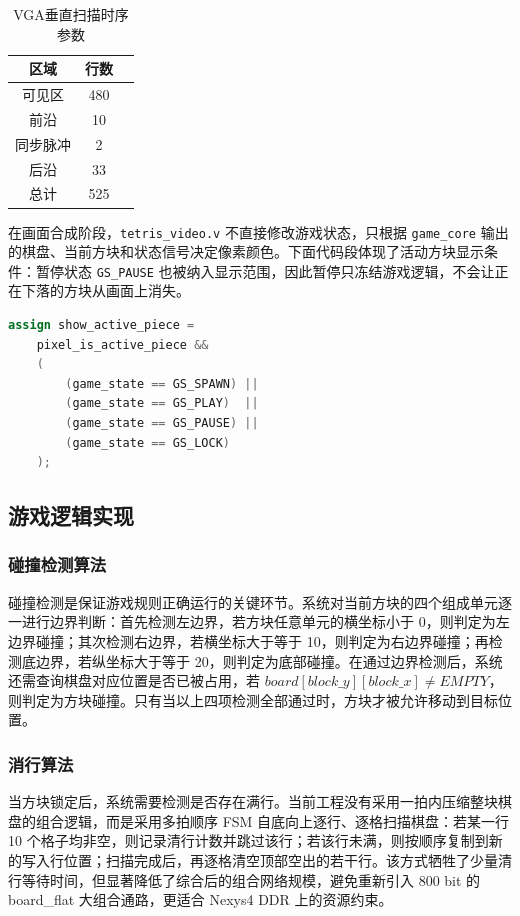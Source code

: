\documentclass[UTF8,zihao=-4]{ctexart}
\begin{document}
\begin{table}[H]
\centering
\caption{VGA垂直扫描时序参数}
\begin{tabular}{ccc}
\toprule
区域 & 行数 \\
\midrule
可见区 & 480 \\
前沿 & 10 \\
同步脉冲 & 2 \\
后沿 & 33 \\
总计 & 525 \\
\bottomrule
\end{tabular}
\end{table}

在画面合成阶段，\texttt{tetris\_video.v} 不直接修改游戏状态，只根据 \texttt{game\_core} 输出的棋盘、当前方块和状态信号决定像素颜色。下面代码段体现了活动方块显示条件：暂停状态 \texttt{GS\_PAUSE} 也被纳入显示范围，因此暂停只冻结游戏逻辑，不会让正在下落的方块从画面上消失。

\begin{lstlisting}[language=Verilog,caption={暂停状态下保持显示活动方块的关键逻辑},label={lst:show_active_piece}]
assign show_active_piece =
    pixel_is_active_piece &&
    (
        (game_state == GS_SPAWN) ||
        (game_state == GS_PLAY)  ||
        (game_state == GS_PAUSE) ||
        (game_state == GS_LOCK)
    );
\end{lstlisting}

\subsection{游戏逻辑实现}
\subsubsection{碰撞检测算法}
碰撞检测是保证游戏规则正确运行的关键环节。系统对当前方块的四个组成单元逐一进行边界判断：首先检测左边界，若方块任意单元的横坐标小于 0，则判定为左边界碰撞；其次检测右边界，若横坐标大于等于 10，则判定为右边界碰撞；再检测底边界，若纵坐标大于等于 20，则判定为底部碰撞。在通过边界检测后，系统还需查询棋盘对应位置是否已被占用，若 $board[block\_y][block\_x]\neq EMPTY$，则判定为方块碰撞。只有当以上四项检测全部通过时，方块才被允许移动到目标位置。

\subsubsection{消行算法}
当方块锁定后，系统需要检测是否存在满行。当前工程没有采用一拍内压缩整块棋盘的组合逻辑，而是采用多拍顺序 FSM 自底向上逐行、逐格扫描棋盘：若某一行 10 个格子均非空，则记录清行计数并跳过该行；若该行未满，则按顺序复制到新的写入行位置；扫描完成后，再逐格清空顶部空出的若干行。该方式牺牲了少量清行等待时间，但显著降低了综合后的组合网络规模，避免重新引入 800 bit 的 board\_flat 大组合通路，更适合 Nexys4 DDR 上的资源约束。
\end{document}
